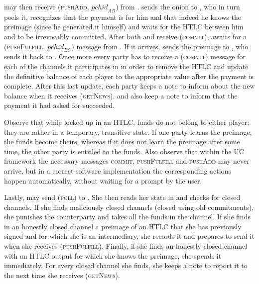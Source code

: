    \bob{} may then receive (\textsc{pushAdd}, $\mathit{pchid}_{AB}$) from
    \environment. \bob{} sends the onion to \charlie, who in turn peels it,
    recognizes that the payment is for him and that indeed he knows the preimage
    (since he generated it himself) and waits for the HTLC between him and
    \bob{} to be irrevocably committed. After both \bob{} and \charlie{} receive
    (\textsc{commit}), \charlie{} awaits for a (\textsc{pushFulfill},
    $\mathit{pchid}_{BC}$) message from \environment. If it arrives, \charlie{}
    sends the preimage to \bob, who sends it back to \alice. Once more every
    party has to receive a (\textsc{commit}) message for each of the channels it
    participates in in order to remove the HTLC and update the definitive
    balance of each player to the appropriate value after the payment is
    complete. After this last update, each party keeps a note to inform
    \environment{} about the new balance when it receives (\textsc{getNews}).
    \alice{} and \charlie{} also keep a note to inform \environment{} that the
    payment it had asked for succeeded.

    Observe that while locked up in an HTLC, funds do not belong to either
    player; they are rather in a temporary, transitive state. If one party
    learns the preimage, the funds become theirs, whereas if it does not learn
    the preimage after some time, the other party is entitled to the funds. Also
    observe that within the UC framework the necessary messages \textsc{commit},
    \textsc{pushFulfill} and \textsc{pushAdd} may never arrive, but in a
    correct software implementation the corresponding actions happen
    automatically, without waiting for a prompt by the user.

    Lastly, \environment{} may send (\textsc{poll}) to \alice. She then reads
    her state in \ledger{} and checks for closed channels. If she finds
    maliciously closed channels (closed using old commitments), she punishes the
    counterparty and takes all the funds in the channel. If she finds in an
    honestly closed channel a preimage of an HTLC that she has previously
    signed and for which she is an intermediary, she records it and prepares to
    send it when she receives (\textsc{pushFulfill}). Finally, if she finds an
    honestly closed channel with an HTLC output for which she knows the
    preimage, she spends it immediately. For every closed channel she finds, she
    keeps a note to report it to \environment{} the next time she receives
    (\textsc{getNews}).

